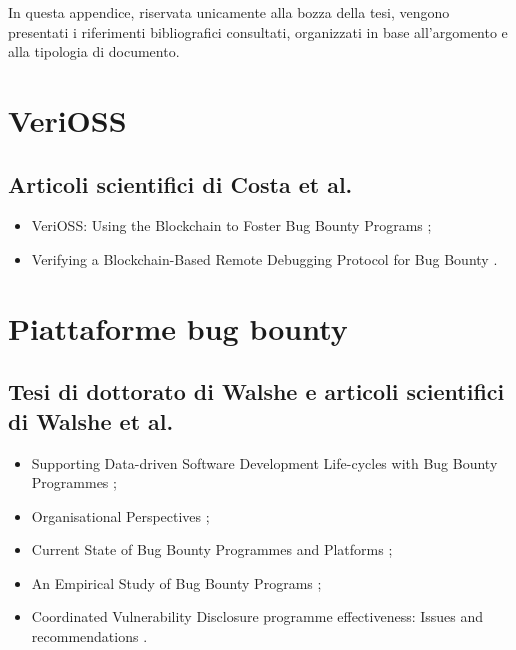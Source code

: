 
In questa appendice, riservata unicamente alla bozza della tesi, vengono presentati i riferimenti bibliografici consultati, organizzati in base all'argomento e alla tipologia di documento.

\section*{VeriOSS}

\subsection*{Articoli scientifici di Costa et al.}
\begin{itemize}

\item VeriOSS: Using the Blockchain to Foster Bug Bounty Programs \cite{canidio2021verioss};

\item Verifying a Blockchain-Based Remote Debugging Protocol for Bug Bounty \cite{degano2021verioss}.

\end{itemize}

\section*{Piattaforme bug bounty}

\subsection*{Tesi di dottorato di Walshe e articoli scientifici di Walshe et al.}
\begin{itemize}

\item Supporting Data-driven Software Development Life-cycles with Bug Bounty Programmes \cite{walshe2023bountythesis};

\item Organisational Perspectives \cite{walshe2023bountythesis2};

\item Current State of Bug Bounty Programmes and Platforms \cite{walshe2023bountythesis3};

\item An Empirical Study of Bug Bounty Programs \cite{walshe2020bountypaper};

\item Coordinated Vulnerability Disclosure programme effectiveness: Issues and recommendations \cite{walshe2022cvdpaper}.

\end{itemize}

